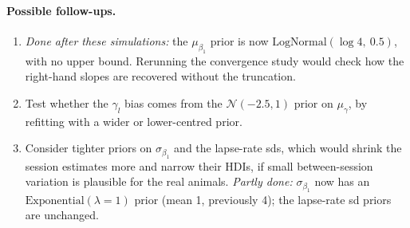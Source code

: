\documentclass[11pt]{article}
\begin{document}
\paragraph{Possible follow-ups.}
\begin{enumerate}
  \item \textit{Done after these simulations:} the $\mu_{\beta_1}$ prior is now
        $\text{LogNormal}(\log 4,\ 0.5)$, with no upper bound. Rerunning the
        convergence study would check how the right-hand slopes are recovered
        without the truncation.
  \item Test whether the $\gamma_l$ bias comes from the $\mathcal{N}(-2.5,1)$
        prior on $\mu_\gamma$, by refitting with a wider or lower-centred prior.
  \item Consider tighter priors on $\sigma_{\beta_1}$ and the lapse-rate sds, which
        would shrink the session estimates more and narrow their HDIs, if
        small between-session variation is plausible for the real animals.
        \textit{Partly done:} $\sigma_{\beta_1}$ now has an
        $\text{Exponential}(\lambda = 1)$ prior (mean 1, previously 4); the
        lapse-rate sd priors are unchanged.
\end{enumerate}
\end{document}
